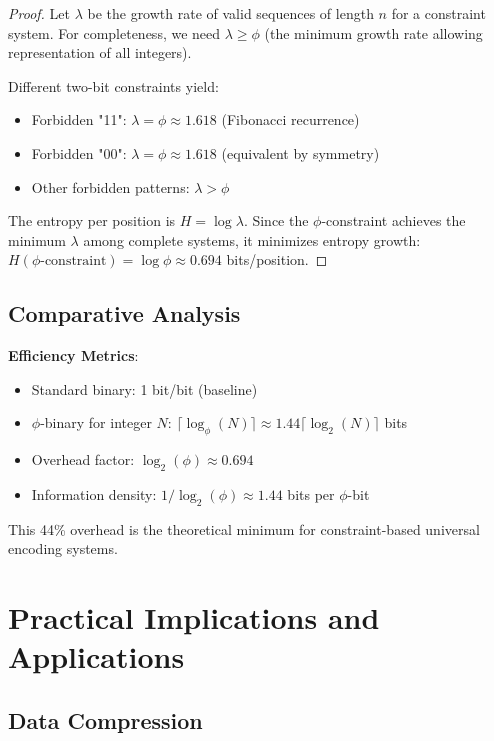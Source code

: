 \documentclass[12pt,letterpaper]{article}
\begin{document}
\begin{proof}
Let $\lambda$ be the growth rate of valid sequences of length $n$ for a constraint system. For completeness, we need $\lambda \geq \phi$ (the minimum growth rate allowing representation of all integers).

Different two-bit constraints yield:
\begin{itemize}
\item Forbidden "11": $\lambda = \phi \approx 1.618$ (Fibonacci recurrence)
\item Forbidden "00": $\lambda = \phi \approx 1.618$ (equivalent by symmetry)  
\item Other forbidden patterns: $\lambda > \phi$
\end{itemize}

The entropy per position is $H = \log \lambda$. Since the $\phi$-constraint achieves the minimum $\lambda$ among complete systems, it minimizes entropy growth: $H(\phi\text{-constraint}) = \log \phi \approx 0.694$ bits/position.
\end{proof}

\subsection{Comparative Analysis}

\textbf{Efficiency Metrics}:
\begin{itemize}
\item Standard binary: 1 bit/bit (baseline)
\item $\phi$-binary for integer $N$: $\lceil\log_\phi(N)\rceil \approx 1.44\lceil\log_2(N)\rceil$ bits
\item Overhead factor: $\log_2(\phi) \approx 0.694$
\item Information density: $1/\log_2(\phi) \approx 1.44$ bits per $\phi$-bit
\end{itemize}

This 44\% overhead is the theoretical minimum for constraint-based universal encoding systems.

\section{Practical Implications and Applications}

\subsection{Data Compression}
\end{document}
